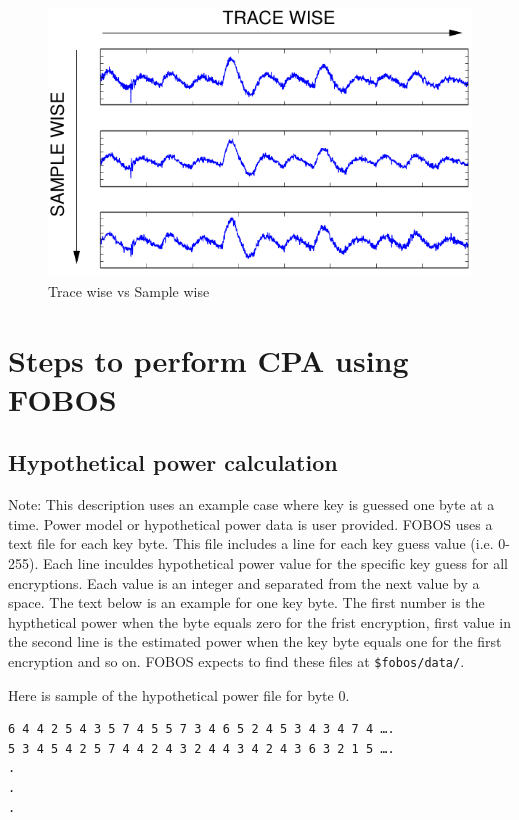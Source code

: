 \begin{figure}[ht]
\begin{center}
\includegraphics[scale=0.6]{figures/sampleVstrace}
\caption{\label{fig:tvs}Trace wise vs Sample wise}
\end{center} 
\vspace{-3ex}
\end{figure}

\section{Steps to perform CPA using FOBOS}
\subsection{Hypothetical power calculation}
Note: This description uses an example case where key is guessed one byte at a time. \newline
Power model or hypothetical power data is user provided. FOBOS uses a text file for each key
byte. This file includes a line for each key guess value (i.e. 0-255). Each line inculdes hypothetical
power value for the specific key guess for all encryptions. Each value is an integer and separated
from the next value by a space. The text below is an example for one key byte. The first number is the
hypthetical power when the byte equals zero for the frist encryption, first value in the second line is
the estimated power when the key byte equals one for the first encryption and so on.
FOBOS expects to find these files at \texttt{\$fobos/data/}.

Here is sample of the hypothetical power file for byte 0.

\begin{verbatim}
6 4 4 2 5 4 3 5 7 4 5 5 7 3 4 6 5 2 4 5 3 4 3 4 7 4 ….
5 3 4 5 4 2 5 7 4 4 2 4 3 2 4 4 3 4 2 4 3 6 3 2 1 5 ….
.
.
.
\end{verbatim}

